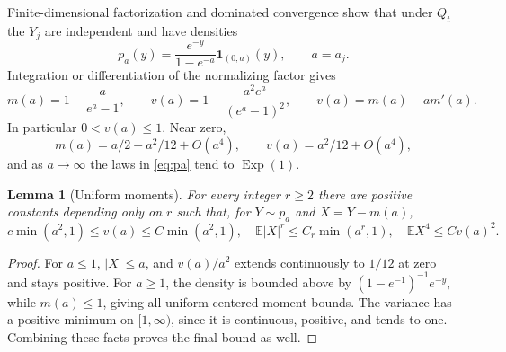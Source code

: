 \documentclass[11pt,a4paper]{article}
\numberwithin{equation}{section}
\newtheorem{lemma}[theorem]{Lemma}
\theoremstyle{definition}
\theoremstyle{remark}
\newcommand{\E}{\mathbb E}
\newcommand{\ind}{\mathbf 1}
\newcommand{\Exp}{\operatorname{Exp}}
\begin{document}
Finite-dimensional factorization and dominated convergence show that
under $Q_t$ the $Y_j$ are independent and have densities
\begin{equation}
 p_a(y)=\frac{e^{-y}}{1-e^{-a}}\ind_{(0,a)}(y),\qquad a=a_j.
 \label{eq:pa}
\end{equation}
Integration or differentiation of the normalizing factor gives
\begin{equation}
 m(a)=1-\frac{a}{e^a-1},\qquad
 v(a)=1-\frac{a^2e^a}{(e^a-1)^2},\qquad
 v(a)=m(a)-a m'(a). \label{eq:mv}
\end{equation}
In particular $0<v(a)\le1$. Near zero,
\[
 m(a)=a/2-a^2/12+O(a^4),\qquad v(a)=a^2/12+O(a^4),
\]
and as $a\to\infty$ the laws in \eqref{eq:pa} tend to $\Exp(1)$.

\begin{lemma}[Uniform moments]
\label{lem:moments}
For every integer $r\ge2$ there are positive constants depending only
on $r$ such that, for $Y\sim p_a$ and $X=Y-m(a)$,
\begin{equation}
 c\min(a^2,1)\le v(a)\le C\min(a^2,1),\quad
 \E|X|^r\le C_r\min(a^r,1),\quad
 \E X^4\le C v(a)^2. \label{eq:moments}
\end{equation}
\end{lemma}
\begin{proof}
For $a\le1$, $|X|\le a$, and $v(a)/a^2$ extends continuously to
$1/12$ at zero and stays positive. For $a\ge1$, the density is bounded
above by $(1-e^{-1})^{-1}e^{-y}$, while $m(a)\le1$, giving all uniform
centered moment bounds. The variance has a positive minimum on
$[1,\infty)$, since it is continuous, positive, and tends to one.
Combining these facts proves the final bound as well.
\end{proof}
\end{document}

